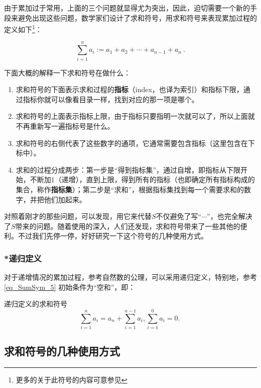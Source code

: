 由于累加过于常用，上面的三个问题就显得尤为突出，因此，迫切需要一个新的手段来避免出现这些问题，数学家们设计了求和符号，用求和符号来表现累加过程的定义如下\footnote{更多的关于此符号的内容可意参见}：

\begin{equation}
\label{eq_SumSym_1}
\sum_{i=1}^n a_i:=a_1+a_2+\cdots+a_{n-1}+a_{n}~.
\end{equation}


下面大概的解释一下求和符号在做什么：
\begin{enumerate}
\item 求和符号的下面表示求和过程的\textbf{指标}（index，也译为索引）和指标下限，通过指标你就可以像看目录一样，找到对应的那一项是哪个。
\item 求和符号的上面表示指标上限，由于指标只要指明一次就可以了，所以上面就不再重新写一遍指标号是什么。
\item 求和符号的右侧代表了这些数字的通项，它通常需要包含指标（这里包含在下标中）。
\item 求和的过程分成两步：第一步是“得到指标集”，通过自增，即指标从下限开始，不断加$1$（递增），直到上限，得到所有的指标（也即确定所有指标构成的集合，称作\textbf{指标集}）；第二步是“求和”，根据指标集找到每一个需要求和的数字，并把他们加起来。
\end{enumerate}

对照着刚才的那些问题，可以发现，用它来代替$S$不仅避免了写“$\cdots$”，也完全解决了$S$带来的问题。随着使用的深入，人们还发现，求和符号带来了一些其他的便利。不过我们先停一停，好好研究一下这个符号的几种使用方式。

\subsubsection{*递归定义}

对于递增情况的累加过程，参考自然数的公理，可以采用递归定义，特别地，参考\autoref{eq_SumSym_5} 初始条件为“空和”，即：

\begin{definition}{递归定义的求和符号}
\begin{equation}
\sum_{i=1}^n a_i = a_n + \sum_{i=1}^{n-1} a_i,\sum_{i=1}^0 a_i=0.~
\end{equation}
\end{definition}


\subsection{求和符号的几种使用方式}

